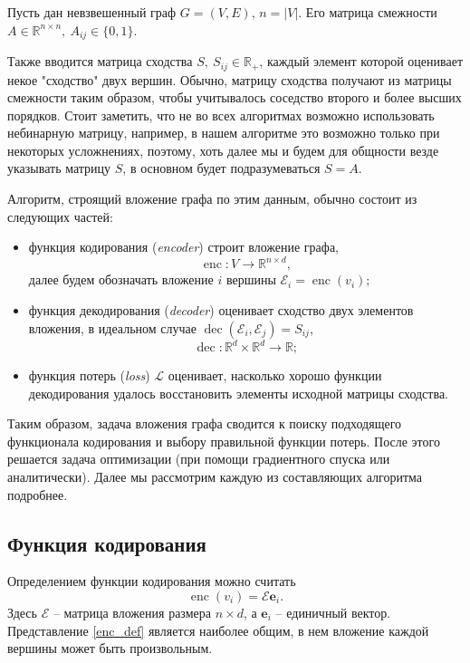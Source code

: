 \documentclass[12pt,a4paper]{extarticle}
\newcommand{\R}{\mathbb{R}}
\newcommand{\E}{\mathcal{E}}
\newcommand{\Loss}{\mathcal{L}}
\newcommand{\encoder}{\operatorname{enc}}
\newcommand{\decoder}{\operatorname{dec}}
\newcommand{\unit}[1]{\textbf{e}_{#1}}
\begin{document}
    Пусть дан невзвешенный граф $G = (V, E)$, $n = |V|$. Его матрица смежности $A \in \R^{n \times n},\ A_{ij} \in \{0, 1\}$.
    
    Также вводится матрица сходства $S,\ S_{ij} \in \R_{+}$,  каждый элемент которой оценивает некое "сходство" двух вершин. Обычно, матрицу сходства получают из матрицы смежности таким образом, чтобы учитывалось соседство второго и более высших порядков. Стоит заметить, что не во всех алгоритмах возможно использовать небинарную матрицу, например, в нашем алгоритме это возможно только при некоторых усложнениях, поэтому, хоть далее мы и будем для общности везде указывать матрицу $S$, в основном будет подразумеваться $S = A$.
    
    Алгоритм, строящий вложение графа по этим данным, обычно состоит из следующих частей:
    \begin{itemize}
        \item функция кодирования (\textit{encoder}) строит вложение графа,
            \[
            \encoder \colon V \to \R^{n \times d},
            \]
            далее будем обозначать вложение $i$ вершины $\E_i = \encoder(v_i)$;
        \item функция декодирования (\textit{decoder}) оценивает сходство двух элементов вложения,
            в идеальном случае $\decoder(\E_i, \E_j) = S_{ij}$,
            \[\decoder \colon \R^{d} \times \R^{d} \to \R;\]
        \item функция потерь (\textit{loss}) $\Loss$ оценивает, насколько хорошо функции декодирования удалось восстановить элементы исходной матрицы сходства.
    \end{itemize}
    
    Таким образом, задача вложения графа сводится к поиску подходящего функционала кодирования и выбору правильной функции потерь. После этого решается задача оптимизации (при помощи градиентного спуска или аналитически). Далее мы рассмотрим каждую из составляющих алгоритма подробнее.

    \subsection{Функция кодирования}
    Определением функции кодирования можно считать
    \begin{equation} \label{enc_def}
        \encoder(v_i) = \E\unit{i}.
    \end{equation}
    Здесь $\E$ -- матрица вложения размера $n \times d$, а $\unit{i}$ -- единичный вектор. Представление \eqref{enc_def} является наиболее общим, в нем вложение каждой вершины может быть произвольным.
    
\end{document}
